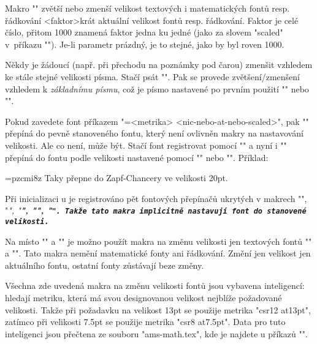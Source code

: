 \begtt
 \typosize[11.5/13]  %
\endtt

Makro "" zvětší nebo zmenší velikost
textových i matematických fontů resp. řádkování <faktor>krát aktuální 
velikost fontů resp. řádkování. 
Faktor je celé číslo, přitom 1000 znamená
faktor jedna ku jedné (jako za slovem "scaled" v~příkazu "\font"). Je-li parametr
prázdný, je to stejné, jako by byl roven 1000.

\begtt
\typoscale[800/800]    %
\typoscale[\magstep2/] %
\endtt

Někdy je žádoucí (např. při přechodu na poznámky pod čarou) zmenšit vzhledem
ke stále stejné velikosti písma. Stačí psát
"\typobase{}". Pak se provede zvětšení/zmenšení
vzhledem k {\em základnímu písmu}, což je písmo nastavené po prvním použití 
"\typosize" nebo "\typoscale".

Pokud zavedete font příkazem "\font\prepinac=<metrika> <nic-nebo-at-nebo-scaled>",
pak "\prepinac" přepíná do pevně stanoveného fontu, který není ovlivněn
makry na nastavování velikosti. Ale co není, může být. Stačí font
registrovat pomocí "\regfont\prepinac" a nyní i "\prepinac" přepíná do fontu
podle velikosti nastavené pomocí "\typosize" nebo "\typoscale". Příklad:
\par\nobreak

\begtt
\font\zapfchan=pzcmi8z  \regfont\zapfchan
\typosize[20/] Taky \zapfchan přepne do Zapf-Chancery ve velikosti 20pt.
\endtt

Při inicializaci \csplain{}u je registrováno pět fontových přepínačů
ukrytých v makrech "\rm", "\it", "\bf", "\bi", "\tt". Takže tato makra
implicitně nastavují font do stanovené velikosti.

Na místo "\typosize" a "\typoscale" je možno použít 
makra na změnu velikosti jen textových fontů
"" a "\textfontscale[<faktor>]".
Tato makra nemění matematické fonty ani řádkování. 
Změní jen velikost jen aktuálního fontu, ostatní fonty zůstávají beze změny.

Všechna zde uvedená makra na změnu velikosti fontů jsou vybavena
inteligencí: hledají metriku, která má svou designovanou velikost nejblíže
požadované velikosti. Takže při požadavku na velikost 13pt se použije metrika
"csr12 at13pt", zatímco při velikosti 7.5pt se použije metrika 
"csr8 at7.5pt". Data pro tuto inteligenci jsou přečtena ze souboru
"ams-math.tex", kde je najdete u příkazů "\regtfm".

